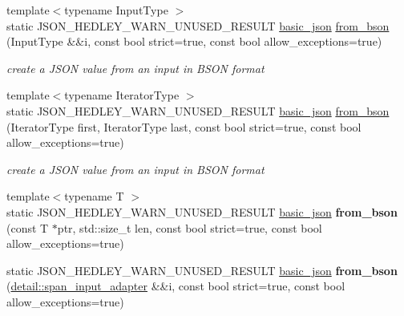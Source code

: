 \begin{DoxyCompactItemize}
\item 
{\footnotesize template$<$typename Input\+Type $>$ }\\static J\+S\+O\+N\+\_\+\+H\+E\+D\+L\+E\+Y\+\_\+\+W\+A\+R\+N\+\_\+\+U\+N\+U\+S\+E\+D\+\_\+\+R\+E\+S\+U\+LT \hyperlink{classnlohmann_1_1basic__json}{basic\+\_\+json} \hyperlink{classnlohmann_1_1basic__json_a4e02793f2691aa29ab7cb69fddafbf5c}{from\+\_\+bson} (Input\+Type \&\&i, const bool strict=true, const bool allow\+\_\+exceptions=true)
\begin{DoxyCompactList}\small\item\em create a J\+S\+ON value from an input in B\+S\+ON format \end{DoxyCompactList}\item 
{\footnotesize template$<$typename Iterator\+Type $>$ }\\static J\+S\+O\+N\+\_\+\+H\+E\+D\+L\+E\+Y\+\_\+\+W\+A\+R\+N\+\_\+\+U\+N\+U\+S\+E\+D\+\_\+\+R\+E\+S\+U\+LT \hyperlink{classnlohmann_1_1basic__json}{basic\+\_\+json} \hyperlink{classnlohmann_1_1basic__json_a4118d0ec23d9eeafc236b9524d220e94}{from\+\_\+bson} (Iterator\+Type first, Iterator\+Type last, const bool strict=true, const bool allow\+\_\+exceptions=true)
\begin{DoxyCompactList}\small\item\em create a J\+S\+ON value from an input in B\+S\+ON format \end{DoxyCompactList}\item 
\mbox{\label{classnlohmann_1_1basic__json_ae2612581e4788ddffc2f45d5e4cc04fc}} 
{\footnotesize template$<$typename T $>$ }\\static J\+S\+O\+N\+\_\+\+H\+E\+D\+L\+E\+Y\+\_\+\+W\+A\+R\+N\+\_\+\+U\+N\+U\+S\+E\+D\+\_\+\+R\+E\+S\+U\+LT \hyperlink{classnlohmann_1_1basic__json}{basic\+\_\+json} {\bfseries from\+\_\+bson} (const T $\ast$ptr, std\+::size\+\_\+t len, const bool strict=true, const bool allow\+\_\+exceptions=true)
\item 
\mbox{\label{classnlohmann_1_1basic__json_a2afe89884edf72412a0624982324755d}} 
static J\+S\+O\+N\+\_\+\+H\+E\+D\+L\+E\+Y\+\_\+\+W\+A\+R\+N\+\_\+\+U\+N\+U\+S\+E\+D\+\_\+\+R\+E\+S\+U\+LT \hyperlink{classnlohmann_1_1basic__json}{basic\+\_\+json} {\bfseries from\+\_\+bson} (\hyperlink{classnlohmann_1_1detail_1_1span__input__adapter}{detail\+::span\+\_\+input\+\_\+adapter} \&\&i, const bool strict=true, const bool allow\+\_\+exceptions=true)
\end{DoxyCompactItemize}
